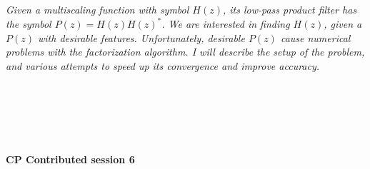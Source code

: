 \begin{multicols}{2}
\\ 
        \\
        \\\\
\\
      \textit{Given a multiscaling function with symbol $H(z)$, its low-pass product
filter has the symbol $P(z) = H(z) H(z)^*$. We are interested in
finding $H(z)$, given a $P(z)$ with desirable features. Unfortunately,
desirable $P(z)$ cause numerical problems with the factorization
algorithm. 
I will describe the setup of the problem, and various attempts to speed up
its convergence and improve accuracy.}\\
\\ 
        \\
        \\\\
\\
\end{multicols}
  \noindent\textbf{CP Contributed session 6}\\
  \textit{} \\
    
